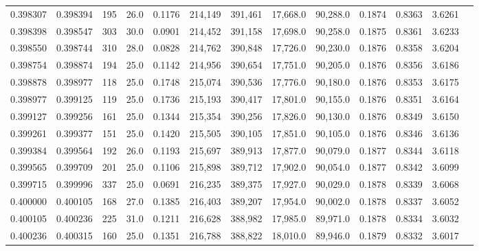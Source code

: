 \begin{tabular}{rrrrrrrrrrrrr}
0.398307 & 0.398394 &   195 & 26.0 &                                     0.1176 & 214,149 & 391,461 &  17,668.0 &  90,288.0 & 0.1874 & 0.8363 & 3.6261 \\
0.398398 & 0.398547 &   303 & 30.0 &                                     0.0901 & 214,452 & 391,158 &  17,698.0 &  90,258.0 & 0.1875 & 0.8361 & 3.6233 \\
0.398550 & 0.398744 &   310 & 28.0 &                                     0.0828 & 214,762 & 390,848 &  17,726.0 &  90,230.0 & 0.1876 & 0.8358 & 3.6204 \\
0.398754 & 0.398874 &   194 & 25.0 &                                     0.1142 & 214,956 & 390,654 &  17,751.0 &  90,205.0 & 0.1876 & 0.8356 & 3.6186 \\
0.398878 & 0.398977 &   118 & 25.0 &                                     0.1748 & 215,074 & 390,536 &  17,776.0 &  90,180.0 & 0.1876 & 0.8353 & 3.6175 \\
0.398977 & 0.399125 &   119 & 25.0 &                                     0.1736 & 215,193 & 390,417 &  17,801.0 &  90,155.0 & 0.1876 & 0.8351 & 3.6164 \\
0.399127 & 0.399256 &   161 & 25.0 &                                     0.1344 & 215,354 & 390,256 &  17,826.0 &  90,130.0 & 0.1876 & 0.8349 & 3.6150 \\
0.399261 & 0.399377 &   151 & 25.0 &                                     0.1420 & 215,505 & 390,105 &  17,851.0 &  90,105.0 & 0.1876 & 0.8346 & 3.6136 \\
0.399384 & 0.399564 &   192 & 26.0 &                                     0.1193 & 215,697 & 389,913 &  17,877.0 &  90,079.0 & 0.1877 & 0.8344 & 3.6118 \\
0.399565 & 0.399709 &   201 & 25.0 &                                     0.1106 & 215,898 & 389,712 &  17,902.0 &  90,054.0 & 0.1877 & 0.8342 & 3.6099 \\
0.399715 & 0.399996 &   337 & 25.0 &                                     0.0691 & 216,235 & 389,375 &  17,927.0 &  90,029.0 & 0.1878 & 0.8339 & 3.6068 \\
0.400000 & 0.400105 &   168 & 27.0 &                                     0.1385 & 216,403 & 389,207 &  17,954.0 &  90,002.0 & 0.1878 & 0.8337 & 3.6052 \\
0.400105 & 0.400236 &   225 & 31.0 &                                     0.1211 & 216,628 & 388,982 &  17,985.0 &  89,971.0 & 0.1878 & 0.8334 & 3.6032 \\
0.400236 & 0.400315 &   160 & 25.0 &                                     0.1351 & 216,788 & 388,822 &  18,010.0 &  89,946.0 & 0.1879 & 0.8332 & 3.6017 \\

\end{tabular}
